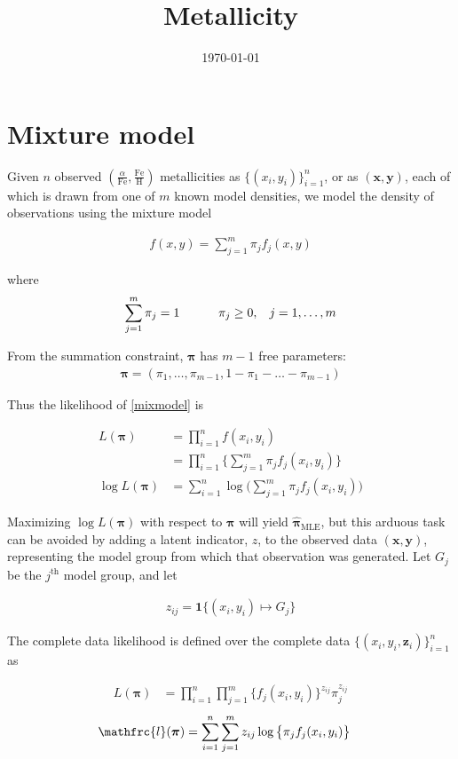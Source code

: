 \documentclass[12pt]{amsart}
\title{Metallicity}
\author{\today}
\newcommand{\vect}[1]{\boldsymbol{\mathbf{#1}}}
\newcommand{\eqn}[1]{\begin{align*}
#1
\end{align*}}
\newcommand{\eqnl}[2]{\begin{align} \label{#1}
#2
\end{align}}
\newcommand{\shblock}{\hspace{3mm}}
\newcommand{\hblock}{\hspace{8mm}}
\newcommand{\eqnsep}{\shblock\hblock}
\newcommand{\bl}{\big\{}
\newcommand{\br}{\big\}}
\newcommand{\Bl}{\Big\{}
\newcommand{\Br}{\Big\}}
\newcommand{\indicator}{\mathbf{1}}
\newcommand{\vx}{\vect{x}}
\newcommand{\vy}{\vect{y}}
\newcommand{\vp}{\vect{\pi}}
\newcommand{\vpmle}{\hat{\vect{\pi}}_\text{MLE}}
\newcommand{\fab}{f_j}
\newcommand{\llp}{\mathfrc{l}(\vect{\pi})}
\newcommand{\sumn}{\sum^n_{i=1}}
\newcommand{\summ}{\sum^m_{j=1}}
\begin{document}
\maketitle






\section{Mixture model}

Given $n$ observed $(\frac{\alpha}{\text{Fe}}, \frac{\text{Fe}}{\text{H}})$ metallicities as $\bl (x_i,y_i) \br^n_{i=1}$, or as $(\vx,\vy)$, each of which is drawn from one of $m$ known model densities, we model the density of observations using the mixture model

\eqnl{mixmodel}{
	f(x,y) = \summ \pi_j \fab(x,y)
}

where \eqn{
	\summ \pi_j = 1 \eqnsep \pi_j \geq 0, \hspace{3mm} j=1,\ldots,m
 }

From the summation constraint, $\vp$ has $m-1$ free parameters: \eqn{
	\vp = (\pi_1, \ldots, \pi_{m-1}, 1-\pi_1-\ldots-\pi_{m-1})
}

Thus the likelihood of \eqref{mixmodel} is

\eqn{
	L(\vect{\pi}) &= \prod^n_{i=1} f(x_i,y_i)	 \\
	&= \prod^n_{i=1} \Bl  \summ \pi_j \fab(x_i,y_i)  \Br	\\
	\log L(\vect{\pi}) &= \sumn \log \Big( \summ \pi_j \fab(x_i,y_i)  \Big)
}

Maximizing $\log L(\vect{\pi})$ with respect to $\vp$ will yield $\vpmle$, but this arduous task can be avoided by adding a latent indicator, $z$, to the observed data $(\vx, \vy)$, representing the model group from which that observation was generated. Let $G_j$ be the $j^\text{th}$ model group, and let

\eqn{z_{ij} = \indicator \bl (x_i,y_i) \mapsto G_j \br}


The complete data likelihood is defined over the complete data $\bl (x_i,y_i,\vect{z}_i) \br^n_{i=1}$ as

\eqn{
	L(\vect{\pi}) &= \prod^n_{i=1} \prod^m_{j=1} \Bl \fab(x_i,y_i) \Br ^{z_{ij}} \pi_j^{z_{ij}}
}
\eqnl{loglike}{
	\llp &= \sumn \summ z_{ij}  \log \bl \pi_j  \fab(x_i,y_i) \br
}





\end{document}
